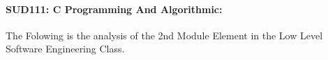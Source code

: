 \documentclass[12pt]{extreport}
\begin{document}
\begin{comment}
\subparagraph{Interpretation of the Box-plots:}
For This Element 

\begin{enumerate}	
	\item The MP Class Box-Plot:
	\begin{enumerate}
		\item MAX = a {} {} {} {} {} {} {} {} UQ = b {} {} {} {} {} {} {} {} Median = c
		\item LQ = d {} {} {} {} {} {} {} {}  MIN =	l {} {} {} {} {} {} {} {}  IQR = e - f = g
	\end{enumerate}
	\item The PSI Class Box-Plot:
	\begin{enumerate}
		\item MAX = a {} {} {} {} {} {} {} {} UQ = b {} {} {} {} {} {} {} {} Median = c
		\item LQ = d {} {} {} {} {} {} {} {}  MIN =	e {} {} {} {} {} {} {} {} IQR = f - g = h	
	\end{enumerate}
	\item The TSI Class Box-Plot:
	\begin{enumerate}
		\item MAX = a {} {} {} {} {} {} {} {} UQ = b {} {} {} {} {} {} {} {} Median = c
		\item LQ = d {} {} {} {} {} {} {} {} MIN = e {} {} {} {} {} {} {} {} IQR = f - g = h	
	\end{enumerate}
\end{enumerate}



\subparagraph{Interpretation of the histogram:}
This Frequency Distribution is (Skeness) with the following descriptive statistics:
\begin{enumerate}
	\item Mean = 
	\item STD = 
	\item Range = a - b = c
	\item IQR = a-b = c 
\end{enumerate}

\end{comment}



\paragraph{\large SUD111: C Programming And Algorithmic:\\
}  
The Folowing is the analysis of the 2nd Module Element in the Low Level Software Engineering Class.
\end{document}
